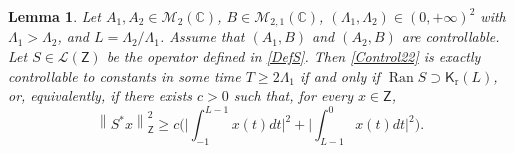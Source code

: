 \documentclass[JEP,XML,SOM,Unicode]{cedram}
\theoremstyle{plain}
\newtheorem{lemm}[theo]{Lemma}
\theoremstyle{definition}
\DeclareMathOperator{\range}{Ran}
\newcommand{\norm}[1]{\left\lVert #1\right\lVert}
\newcommand{\bgabs}[1]{\biggl\lvert #1\biggr \rvert}
\begin{document}
\begin{lemm}
\label{LemmIneqObservS}
Let $A_1, A_2 \in \mathcal M_2(\mathbb C)$, $B \in \mathcal M_{2, 1}(\mathbb C)$, $(\Lambda_1, \Lambda_2) \in (0, +\infty)^2$ with $\Lambda_1 > \Lambda_2$, and $L = \Lambda_2 / \Lambda_1$. Assume that $(A_1, B)$ and $(A_2, B)$ are controllable. Let $S \in \mathcal L(\mathsf Z)$ be the operator defined in \eqref{DefS}. Then \eqref{Control22} is exactly controllable to constants in some time $T \geq 2 \Lambda_1$ if and only if $\range S \supset \mathsf K_{\mathrm r}(L)$, or, equivalently, if there exists $c > 0$ such that, for every $x \in \mathsf Z$,
\begin{equation}
\label{IneqObservS}
\norm{S^\ast x}_{\mathsf Z}^2 \geq c \biggl(\bgabs{\int_{-1}^{L-1} x(t) dt}^2 + \bgabs{\int_{L-1}^{0} x(t) dt}^2\biggr).
\end{equation}
\end{lemm}
\end{document}
